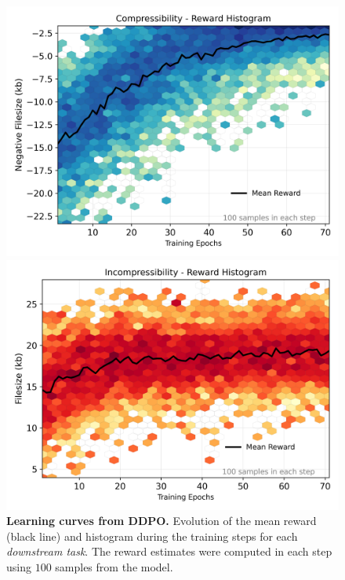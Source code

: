 \begin{figure}[ht]
\begin{minipage}{0.5\textwidth}
  \end{minipage}\vspace{-0.1cm} %
  \begin{minipage}{0.5\textwidth}
      \centering
      \includegraphics[width=1\textwidth]{img/results/reward_hist-jpeg-compressibility.png} %
  \end{minipage}\hfill
  \begin{minipage}{0.5\textwidth}
      \centering
      \includegraphics[width=1\textwidth]{img/results/reward_hist-jpeg-incompressibility.png} %
  \end{minipage}
  \vspace{-8pt}  %
    \captionsetup{width=\textwidth} %
    \caption{\textbf{Learning curves from DDPO.} Evolution of the mean reward (black line) and histogram during the training steps for each \textit{downstream task}. The reward estimates were computed in each step using $100$ samples from the model.}
  \label{fig:reward_hist} %
\end{figure}

